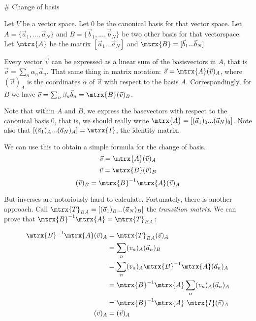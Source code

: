 # Change of basis\label{changeOfBasis}

Let $V$ be a vector space. Let $0$ be the canonical basis for that vector space. Let $A = \{\vec{a}_1, ..., \vec{a}_N \}$ and $B = \{\vec{b}_1, ..., \vec{b}_N\}$ be two other basis for that vectorspace. Let $\mtrx{A}$ be the matrix $[\vec{a}_1  ...  \vec{a}_N]$ and $\mtrx{B} = [\vec{b}_1 ... \vec{b}_N]$

Every vector $\vec{v}$ can be expressed as a linear sum of the basisvectors in $A$, that is $\vec{v} = \sum_n \alpha_n \vec{a}_n$. That same thing in matrix notation: $\vec{v} = \mtrx{A}(\vec{v})_A$, where $(\vec{v})_A$ is the coordinates $\alpha$ of $\vec{v}$ with respect to the basis $A$. Correspondingly, for $B$ we have $\vec{v} = \sum_n \beta_n \vec{b}_n = \mtrx{B}(\vec{v})_B$.

Note that within $A$ and $B$, we express the basevectors with respect to the canonical basis $0$, that is, we should really write $\mtrx{A} = [(\vec{a}_1)_0  ...  (\vec{a}_N)_0]$. Note also that $[(\vec{a}_1)_A  ...  (\vec{a}_N)_A] = \mtrx{I}$, the identity matrix. 

We can use this to obtain a simple formula for the change of basis. 
$$ \vec{v} = \mtrx{A} (\vec{v})_A $$
$$ \vec{v} = \mtrx{B} (\vec{v})_B $$
$$ (\vec{v})_B = \mtrx{B}^{-1} \mtrx{A} (\vec{v})_A $$

But inverses are notoriously hard to calculate. Fortunately, there is another approach. Call $\mtrx{T}_{BA} = [(\vec{a}_1)_B ... (\vec{a}_N)_B]$ the \emph{transition matrix}. We can prove that $\mtrx{B}^{-1} \mtrx{A} = \mtrx{T}_{BA}$:

\begin{equation}
\begin{aligned}
\mtrx{B}^{-1} \mtrx{A} (\vec{v})_A &= \mtrx{T}_{BA}  (\vec{v})_A \\
                                   &= \sum_n (v_n)_A (\vec{a}_n)_B \\
                                   &= \sum_n (v_n)_A \mtrx{B}^{-1} \mtrx{A} (\vec{a}_n)_A \\
                                   &= \mtrx{B}^{-1} \mtrx{A} \sum_n (v_n)_A (\vec{a}_n)_A \\
                                   &= \mtrx{B}^{-1} \mtrx{A} \text{  } \mtrx{I} (\vec{v})_A \\
                    (\vec{v})_A &=  (\vec{v})_A         
\end{aligned}
\end{equation}

